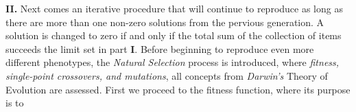 \textbf{II.} Next comes an iterative procedure that will continue to reproduce as long as there are more than one non-zero solutions from the pervious generation. A solution is changed to zero if and only if the total sum of the collection of items succeeds the limit set in part \textbf{I}. Before beginning to reproduce even more different phenotypes, the \emph{Natural Selection} process is introduced, where \emph{fitness, single-point crossovers, and mutations}, all concepts from \emph{Darwin's} Theory of Evolution are assessed. First we proceed to the fitness function, where its purpose is to            
